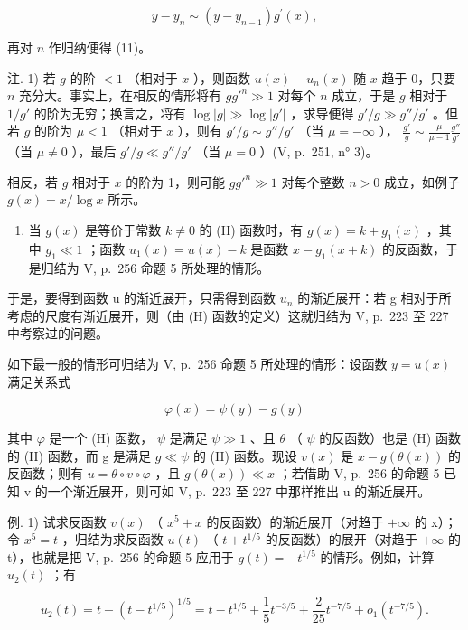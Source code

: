 \[
y - y _ {n} \sim (y - y _ {n - 1}) g ^ {\prime} (x),
\]

再对 \(n\) 作归纳便得 (11)。

注. 1) 若 \(g\) 的阶 \(< 1\) （相对于 \(x\) ），则函数 \(u(x) - u_n(x)\) 随 \(x\) 趋于 0，只要 \(n\) 充分大。事实上，在相反的情形将有 \(gg'^n \gg 1\) 对每个 \(n\) 成立，于是 \(g\) 相对于 \(1 / g'\) 的阶为无穷；换言之，将有 \(\log |g| \gg \log |g'|\) ，求导便得 \(g'/g \gg g''/g'\) 。但若 \(g\) 的阶为 \(\mu < 1\) （相对于 \(x\) ），则有 \(g'/g \sim g''/g'\) （当 \(\mu = -\infty\) ）， \(\frac{g'}{g} \sim \frac{\mu}{\mu - 1} \frac{g''}{g'}\) （当 \(\mu \neq 0\) ），最后 \(g'/g \ll g''/g'\) （当 \(\mu = 0\) ）(V, p.~251, n° 3)。

相反，若 \(g\) 相对于 \(x\) 的阶为 1，则可能 \(gg'^n \gg 1\) 对每个整数 \(n > 0\) 成立，如例子 \(g(x) = x / \log x\) 所示。

\begin{enumerate}
\def\labelenumi{\arabic{enumi})}
\setcounter{enumi}{1}
\tightlist
\item
  当 \(g(x)\) 是等价于常数 \(k \neq 0\) 的 (H) 函数时，有 \(g(x) = k + g_1(x)\) ，其中 \(g_1 \ll 1\) ；函数 \(u_1(x) = u(x) - k\) 是函数 \(x - g_1(x + k)\) 的反函数，于是归结为 V, p.~256 命题 5 所处理的情形。
\end{enumerate}

于是，要得到函数 u 的渐近展开，只需得到函数 \(u_{n}\) 的渐近展开：若 g 相对于所考虑的尺度有渐近展开，则（由 (H) 函数的定义）这就归结为 V, p.~223 至 227 中考察过的问题。

如下最一般的情形可归结为 V, p.~256 命题 5 所处理的情形：设函数 \(y = u(x)\) 满足关系式

\[
\varphi (x) = \psi (y) - g (y)\tag{15}
\]

其中 \(\varphi\) 是一个 (H) 函数， \(\psi\) 是满足 \(\psi \gg 1\) 、且 \(\theta\) （ \(\psi\) 的反函数）也是 (H) 函数的 (H) 函数，而 g 是满足 \(g \ll \psi\) 的 (H) 函数。现设 \(v(x)\) 是 \(x - g(\theta(x))\) 的反函数；则有 \(u = \theta \circ v \circ \varphi\) ，且 \(g(\theta(x)) \ll x\) ；若借助 V, p.~256 的命题 5 已知 v 的一个渐近展开，则可如 V, p.~223 至 227 中那样推出 u 的渐近展开。

例. 1) 试求反函数 \(v(x)\) （ \(x^{5} + x\) 的反函数）的渐近展开（对趋于 \(+\infty\) 的 x）；令 \(x^{5} = t\) ，归结为求反函数 \(u(t)\) （ \(t + t^{1/5}\) 的反函数）的展开（对趋于 \(+\infty\) 的 t），也就是把 V, p.~256 的命题 5 应用于 \(g(t) = -t^{1/5}\) 的情形。例如，计算 \(u_{2}(t)\) ；有

\[
u _ {2} (t) = t - \left(t - t ^ {1 / 5}\right) ^ {1 / 5} = t - t ^ {1 / 5} + \frac {1}{5} t ^ {- 3 / 5} + \frac {2}{2 5} t ^ {- 7 / 5} + o _ {1} \left(t ^ {- 7 / 5}\right).
\]

